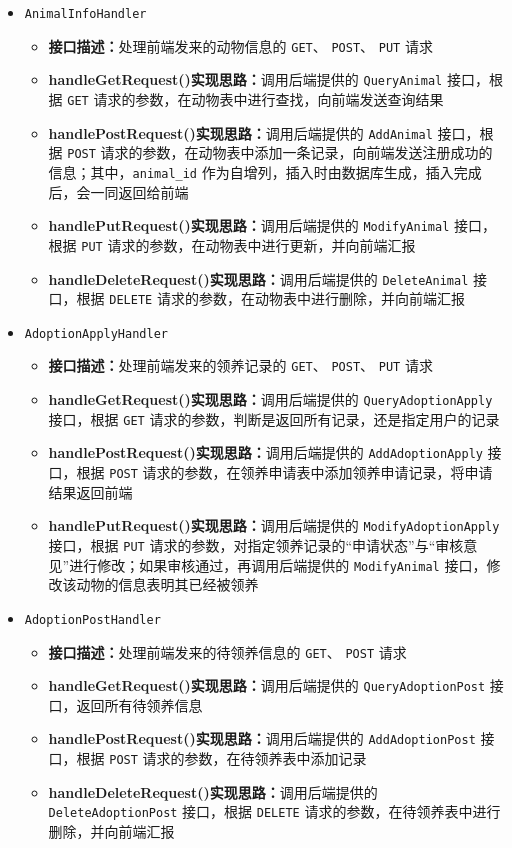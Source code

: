 \documentclass[12pt,a4paper,UTF8]{article}
\begin{document}
\begin{itemize}
  \item \verb|AnimalInfoHandler|
  \begin{itemize}
  \item \textbf{接口描述：}处理前端发来的动物信息的 \verb|GET|、 \verb|POST|、 \verb|PUT| 请求
  \item \textbf{handleGetRequest()实现思路：}调用后端提供的 \verb|QueryAnimal| 接口，根据 \verb|GET| 请求的参数，在动物表中进行查找，向前端发送查询结果
  \item \textbf{handlePostRequest()实现思路：}调用后端提供的 \verb|AddAnimal| 接口，根据 \verb|POST| 请求的参数，在动物表中添加一条记录，向前端发送注册成功的信息；其中，\verb|animal_id| 作为自增列，插入时由数据库生成，插入完成后，会一同返回给前端
  \item \textbf{handlePutRequest()实现思路：}调用后端提供的 \verb|ModifyAnimal| 接口，根据 \verb|PUT| 请求的参数，在动物表中进行更新，并向前端汇报
  \item \textbf{handleDeleteRequest()实现思路：}调用后端提供的 \verb|DeleteAnimal| 接口，根据 \verb|DELETE| 请求的参数，在动物表中进行删除，并向前端汇报
  \end{itemize}

  \item \verb|AdoptionApplyHandler|
  \begin{itemize}
  \item \textbf{接口描述：}处理前端发来的领养记录的 \verb|GET|、 \verb|POST|、 \verb|PUT| 请求
  \item \textbf{handleGetRequest()实现思路：}调用后端提供的 \verb|QueryAdoptionApply| 接口，根据 \verb|GET| 请求的参数，判断是返回所有记录，还是指定用户的记录
  \item \textbf{handlePostRequest()实现思路：}调用后端提供的 \verb|AddAdoptionApply| 接口，根据 \verb|POST| 请求的参数，在领养申请表中添加领养申请记录，将申请结果返回前端
  \item \textbf{handlePutRequest()实现思路：}调用后端提供的 \verb|ModifyAdoptionApply| 接口，根据 \verb|PUT| 请求的参数，对指定领养记录的“申请状态”与“审核意见”进行修改；如果审核通过，再调用后端提供的 \verb|ModifyAnimal| 接口，修改该动物的信息表明其已经被领养
  \end{itemize}

  \item \verb|AdoptionPostHandler|
  \begin{itemize}
  \item \textbf{接口描述：}处理前端发来的待领养信息的 \verb|GET|、 \verb|POST| 请求
  \item \textbf{handleGetRequest()实现思路：}调用后端提供的 \verb|QueryAdoptionPost| 接口，返回所有待领养信息
  \item \textbf{handlePostRequest()实现思路：}调用后端提供的 \verb|AddAdoptionPost| 接口，根据 \verb|POST| 请求的参数，在待领养表中添加记录
  \item \textbf{handleDeleteRequest()实现思路：}调用后端提供的 \verb|DeleteAdoptionPost| 接口，根据 \verb|DELETE| 请求的参数，在待领养表中进行删除，并向前端汇报
  \end{itemize}


\end{itemize}
\end{document}
